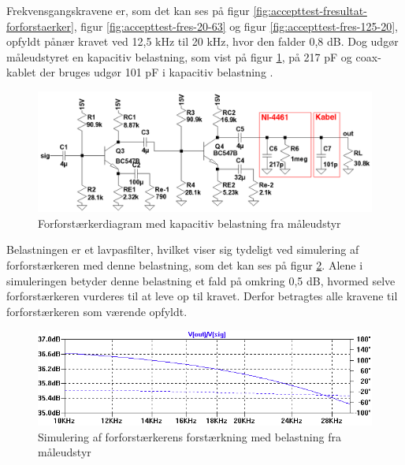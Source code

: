 Frekvensgangskravene er, som det kan ses på figur \ref{fig:accepttest-fresultat-forforstaerker}, figur \ref{fig:accepttest-fres-20-63} og figur \ref{fig:accepttest-fres-125-20}, opfyldt pånær kravet ved 12,5 kHz til 20 kHz, hvor den falder 0,8 dB. Dog udgør måleudstyret en kapacitiv belastning, som vist på figur \ref{fig:cap-error-diagram}, på 217 pF og coax-kablet der bruges udgør 101 pF i kapacitiv belastning \cite{maaling-mm5}.%

\begin{figure}[h]
\centering
\includegraphics[scale=0.35]{teknisk/forforstaerker/cap-error-diagram.png}
\caption{Forforstærkerdiagram med kapacitiv belastning fra måleudstyr}
\label{fig:cap-error-diagram}
\end{figure}

Belastningen er et lavpasfilter, hvilket viser sig tydeligt ved simulering af forforstærkeren med denne belastning, som det kan ses på figur \ref{fig:cap-error}. Alene i simuleringen betyder denne belastning et fald på omkring 0,5 dB, hvormed selve forforstærkeren vurderes til at leve op til kravet. Derfor betragtes alle kravene til forforstærkeren som værende opfyldt.

\begin{figure}[h]
\centering
\includegraphics[width=\textwidth]{teknisk/forforstaerker/cap-error.png}
\caption{Simulering af forforstærkerens forstærkning med belastning fra måleudstyr}
\label{fig:cap-error}
\end{figure}

